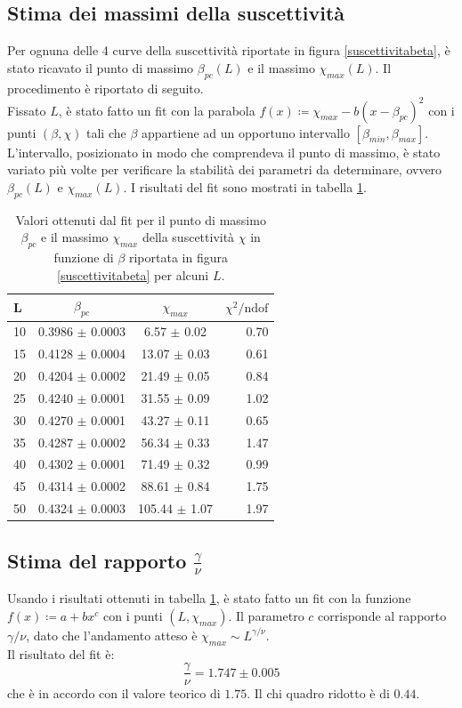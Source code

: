 \documentclass[10pt,a4paper]{article}
\begin{document}
\subsection*{Stima dei massimi della suscettività}
Per ognuna delle 4 curve della suscettività riportate in figura \ref{suscettivitabeta}, è stato ricavato il punto di massimo $\beta_{pc}(L)$ e il massimo $\chi_{max}(L)$. Il procedimento è riportato di seguito.\\
Fissato $L$, è stato fatto un fit con la parabola $f(x)\coloneqq\chi_{max}-b(x-\beta_{pc})^2$ con i punti $(\beta,\chi)$ tali che $\beta$ appartiene ad un opportuno intervallo $[\beta_{min},\beta_{max}]$. L'intervallo, posizionato in modo che comprendeva il punto di massimo, è stato variato più volte per verificare la stabilità dei parametri da determinare, ovvero $\beta_{pc}(L)$ e $\chi_{max}(L)$. I risultati del fit sono mostrati in tabella \ref{suscmax}. %
\begin{table}[h]
\centering 
\begin{tabular}{lccr}
L & $\beta_{pc}$ & $ \chi _{max}$ & $\chi^2/ \mathrm{ndof} $\\ \hline
10 & 0.3986 $\pm$ 0.0003 & 6.57 $\pm$ 0.02 & 0.70\\
15 & 0.4128 $\pm$ 0.0004 & 13.07 $\pm$ 0.03 & 0.61\\
20 & 0.4204 $\pm$ 0.0002 & 21.49 $\pm$ 0.05 & 0.84\\
25 & 0.4240 $\pm$ 0.0001 & 31.55 $\pm$ 0.09 & 1.02\\
30 & 0.4270 $\pm$ 0.0001 & 43.27 $\pm$ 0.11 & 0.65\\
35 & 0.4287 $\pm$ 0.0002 & 56.34 $\pm$ 0.33 & 1.47\\
40 & 0.4302 $\pm$ 0.0001 & 71.49 $\pm$ 0.32 & 0.99\\
45 & 0.4314 $\pm$ 0.0002 & 88.61 $\pm$ 0.84 & 1.75\\
50 & 0.4324 $\pm$ 0.0003 & 105.44 $\pm$ 1.07 & 1.97\\
\end{tabular}
\caption{Valori ottenuti dal fit per il punto di massimo $\beta_{pc}$ e il massimo $\chi _{max}$ della suscettività $\chi$ in funzione di $\beta$ riportata in figura \ref{suscettivitabeta} per alcuni $L$.}
\label{suscmax}
\end{table}

\subsection*{Stima del rapporto $\frac{\gamma}{\nu}$}
Usando i risultati ottenuti in tabella  \ref{suscmax}, è stato fatto un fit con la funzione $f(x)\coloneqq a+bx^c$ con i punti $(L,\chi_{max})$. Il parametro $c$ corrisponde al rapporto $\gamma/\nu$, dato che l'andamento atteso è $ \chi_{max}\sim L^{\gamma/\nu}$.\\%
Il risultato del fit è: $$\frac{\gamma}{\nu}=1.747\pm 0.005$$ che è in accordo con il valore teorico di $1.75$. Il chi quadro ridotto è di $0.44$.
\end{document}
